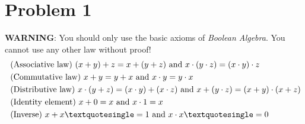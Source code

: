 \section*{Problem 1}
	{\color{orange} \textbf{WARNING}}: You should only use the basic axioms of \textit{Boolean Algebra}. You cannot use any other law without proof!
	\begin{align}
		&\text{(Associative law) }(x + y) + z = x + (y + z)\text{ and }x\cdot(y\cdot z) = (x\cdot y)\cdot z \label{A}\\
		&\text{(Commutative law) }x + y = y + x\text{ and }x\cdot y = y\cdot x \label{C}\\
		&\text{(Distributive law) }x\cdot(y + z) = (x\cdot y) + (x\cdot z)\text{ and }x + (y\cdot z) = (x+y)\cdot(x+z) \label{D}\\\
		&\text{(Identity element) }x + 0 = x\text{ and }x\cdot1 = x \label{E}\\
		&\text{(Inverse) }x + x\textquotesingle = 1\text{ and }x\cdot x\textquotesingle = 0 \label{I}
	\end{align}
